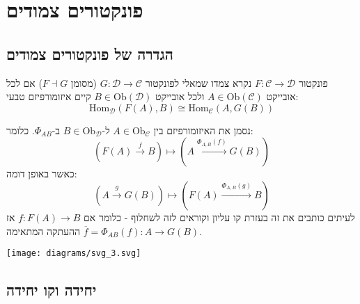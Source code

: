 \documentclass{tstextbook}
\begin{document}
\chapter{פונקטורים צמודים}

\section{הגדרה של פונקטורים צמודים}

\begin{definition}[צמוד]
פונקטור \(F: \mathcal{C} \to \mathcal{D}\) נקרא צמדו שמאלי לפונקטור \(G: \mathcal{D} \to \mathcal{C}\) (מסומן \(F \dashv G\)) אם לכל אובייקט \(A \in \mathrm{Ob}(\mathcal{C})\) ולכל אובייקט \(B \in \mathrm{Ob}(\mathcal{D})\) קיים איזומורפיזם טבעי:
$$\mathrm{Hom}_{\mathcal{D} }(F(A),B)\cong  \mathrm{Hom}_{\mathcal{C} }(A,G(B))$$

\end{definition}
\begin{symbolize}
נסמן את האיזומורפיזם בין \(A\in \mathrm{Ob}_{\mathcal{C}}\) ל-\(B\in \mathrm{Ob}_{\mathcal{D}}\) ב-\(\Phi_{AB}\). כלומר:
$$(F(A)\xrightarrow{f}B)\mapsto(A\xrightarrow{\Phi_{A,B}(f)}G(B))$$
כאשר באופן דומה:
$$(A\xrightarrow{g} G(B))\mapsto(F(A)\xrightarrow{\Phi_{A,B}(g)}B)$$
לעיתים כותבים את זה בעזרת קו עליון וקוראים לזה לשחלוף - כלומר אם \(f:F(A)\to B\) אז \(\overline{f}=\Phi_{AB}(f):A\to G(B)\) ההעתקה המתאימה.

\end{symbolize}
\texttt{[image: diagrams/svg\_3.svg]}
\section{יחידה וקו יחידה}
\end{document}
